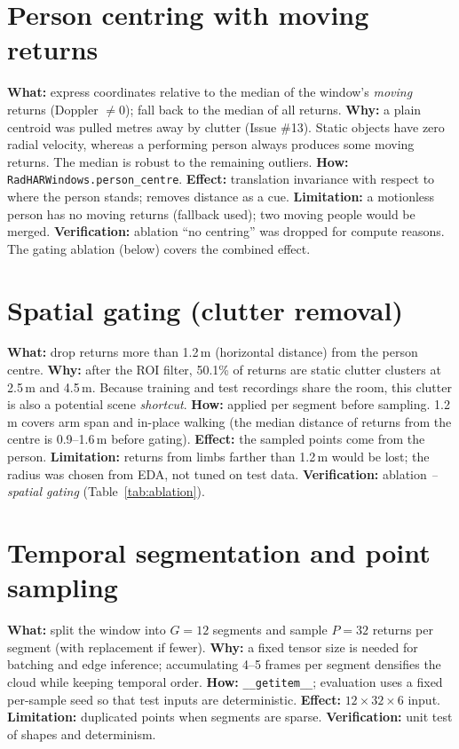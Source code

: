\section{Person centring with moving returns}
\textbf{What:} express coordinates relative to the median of the window's
\emph{moving} returns (Doppler $\neq0$); fall back to the median of all returns.
\textbf{Why:} a plain centroid was pulled metres away by clutter (Issue \#13).
Static objects have zero radial velocity, whereas a performing person always
produces some moving returns. The median is robust to the remaining outliers.
\textbf{How:} \texttt{RadHARWindows.person\_centre}. \textbf{Effect:} translation
invariance with respect to where the person stands; removes distance as a cue.
\textbf{Limitation:} a motionless person has no moving returns (fallback used);
two moving people would be merged. \textbf{Verification:} ablation ``no centring''
was dropped for compute reasons. The gating ablation (below) covers the combined
effect.

\section{Spatial gating (clutter removal)}
\textbf{What:} drop returns more than 1.2\,m (horizontal distance) from the person
centre. \textbf{Why:} after the ROI filter, 50.1\% of returns are static clutter
clusters at 2.5\,m and 4.5\,m. Because training and test recordings share the
room, this clutter is also a potential scene \emph{shortcut}. \textbf{How:} applied
per segment before sampling. 1.2\,m covers arm span and in-place walking (the
median distance of returns from the centre is 0.9--1.6\,m before gating).
\textbf{Effect:} the sampled points come from the person. \textbf{Limitation:}
returns from limbs farther than 1.2\,m would be lost; the radius was chosen from
EDA, not tuned on test data. \textbf{Verification:} ablation \emph{-- spatial gating}
(Table~\ref{tab:ablation}).

\section{Temporal segmentation and point sampling}
\textbf{What:} split the window into $G=12$ segments and sample $P=32$ returns per
segment (with replacement if fewer). \textbf{Why:} a fixed tensor size is needed
for batching and edge inference; accumulating 4--5 frames per segment densifies
the cloud while keeping temporal order. \textbf{How:} \texttt{\_\_getitem\_\_};
evaluation uses a fixed per-sample seed so that test inputs are deterministic.
\textbf{Effect:} $12\times32\times6$ input. \textbf{Limitation:} duplicated points
when segments are sparse. \textbf{Verification:} unit test of shapes and
determinism.

